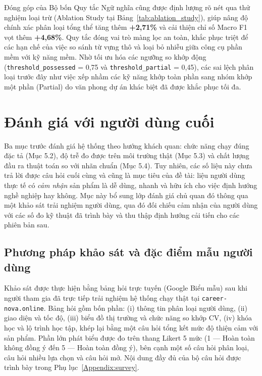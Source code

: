 Đóng góp của Bộ bốn Quy tắc Ngữ nghĩa cũng được định lượng rõ nét qua thử nghiệm loại trừ (Ablation Study tại Bảng~\ref{tab:ablation_study}), giúp nâng độ chính xác phân loại tổng thể tăng thêm \textbf{+2,71\%} và cải thiện chỉ số Macro F1 vọt thêm \textbf{+4,68\%}. Quy tắc đóng vai trò màng lọc an toàn, khắc phục triệt để các hạn chế của việc so sánh từ vựng thô và loại bỏ nhiễu giữa công cụ phần mềm với kỹ năng mềm. Nhờ tối ưu hóa các ngưỡng so khớp động (\texttt{threshold\_possessed} = 0,75 và \texttt{threshold\_partial} = 0,45), các sai lệch phân loại trước đây như việc xếp nhầm các kỹ năng khớp toàn phần sang nhóm khớp một phần (Partial) do văn phong dự án khác biệt đã được khắc phục tối đa.


\section{Đánh giá với người dùng cuối}
\label{sec:end_user_evaluation}

Ba mục trước đánh giá hệ thống theo hướng khách quan: chức năng chạy đúng đặc tả (Mục 5.2), độ trễ đo được trên môi trường thật (Mục 5.3) và chất lượng đầu ra thuật toán so với nhãn chuẩn (Mục 5.4). Tuy nhiên, các số liệu này chưa trả lời được câu hỏi cuối cùng và cũng là mục tiêu của đề tài: liệu người dùng thực tế có \textit{cảm nhận} sản phẩm là dễ dùng, nhanh và hữu ích cho việc định hướng nghề nghiệp hay không. Mục này bổ sung lớp đánh giá chủ quan đó thông qua một khảo sát trải nghiệm người dùng, qua đó đối chiếu cảm nhận của người dùng với các số đo kỹ thuật đã trình bày và thu thập định hướng cải tiến cho các phiên bản sau.

\subsection{Phương pháp khảo sát và đặc điểm mẫu người dùng}

Khảo sát được thực hiện bằng bảng hỏi trực tuyến (Google Biểu mẫu) sau khi người tham gia đã trực tiếp trải nghiệm hệ thống chạy thật tại \texttt{career-nova.online}. Bảng hỏi gồm bốn phần: (i) thông tin phân loại người dùng, (ii) giao diện và tốc độ, (iii) biểu đồ thị trường và chức năng so khớp CV, (iv) khóa học và lộ trình học tập, khép lại bằng một câu hỏi tổng kết mức độ thiện cảm với sản phẩm. Phần lớn phát biểu được đo trên thang Likert 5 mức (1 --- Hoàn toàn không đồng ý đến 5 --- Hoàn toàn đồng ý), bên cạnh một số câu hỏi phân loại, câu hỏi nhiều lựa chọn và câu hỏi mở. Nội dung đầy đủ của bộ câu hỏi được trình bày trong Phụ lục~\ref{Appendix:survey}.

